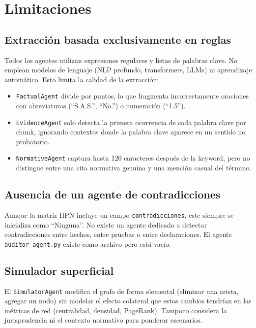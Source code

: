 \documentclass[12pt, letterpaper]{article}
\begin{document}
\section{Limitaciones}

\subsection{Extracción basada exclusivamente en reglas}

Todos los agentes utilizan expresiones regulares y listas de palabras
clave. No emplean modelos de lenguaje (NLP profundo, transformers,
LLMs) ni aprendizaje automático. Esto limita la calidad de la
extracción:

\begin{itemize}[nosep]
  \item \texttt{FactualAgent} divide por puntos, lo que fragmenta
    incorrectamente oraciones con abreviaturas (``S.A.S.'',
    ``No.'') o numeración (``1.5'').
  \item \texttt{EvidenceAgent} solo detecta la primera ocurrencia de
    cada palabra clave por chunk, ignorando contextos donde la
    palabra clave aparece en un sentido no probatorio.
  \item \texttt{NormativeAgent} captura hasta 120 caracteres después
    de la keyword, pero no distingue entre una cita normativa
    genuina y una mención casual del término.
\end{itemize}

\subsection{Ausencia de un agente de contradicciones}

Aunque la matriz HPN incluye un campo \texttt{contradicciones}, este
siempre se inicializa como ``Ninguna''. No existe un agente dedicado
a detectar contradicciones entre hechos, entre pruebas o entre
declaraciones. El agente \texttt{auditor\_agent.py} existe como
archivo pero está vacío.

\subsection{Simulador superficial}

El \texttt{SimulatorAgent} modifica el grafo de forma elemental
(eliminar una arista, agregar un nodo) sin modelar el efecto
colateral que estos cambios tendrían en las métricas de red
(centralidad, densidad, PageRank). Tampoco considera la
jurisprudencia ni el contexto normativo para ponderar escenarios.
\end{document}
